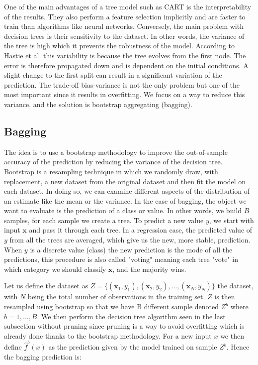 \documentclass[a4paper,12pt]{article}
\numberwithin{equation}{section}
\begin{document}
One of the main advantages of a tree model such as CART is the interpretability of the results. They also perform a feature selection implicitly and are faster to train than algorithms like neural networks. Conversely, the main problem with decision trees is their sensitivity to the dataset. In other words, the variance of the tree is high which it prevents the robustness of the model. According to Hastie et al. this variability is because the tree evolves from the first node. The error is therefore propagated down and is dependent on the initial conditions. A slight change to the first split can result in a significant variation of the prediction. The trade-off bias-variance is not the only problem but one of the most important since it results in overfitting. We focus on a way to reduce this variance, and the solution is bootstrap aggregating (bagging).

\newpage
\subsection{Bagging}

The idea is to use a bootstrap methodology to improve the out-of-sample accuracy of the prediction by reducing the variance of the decision tree. Bootstrap is a resampling technique in which we randomly draw, with replacement, a new dataset from the original dataset and then fit the model on each dataset. In doing so, we can examine different aspects of the distribution of an estimate like the mean or the variance. In the case of bagging, the object we want to evaluate is the prediction of a class or value. In other words, we build $B$ samples, for each sample we create a tree. To predict a new value $y$, we start with input $\boldsymbol{x}$ and pass it through each tree. In a regression case, the predicted value of $y$ from all the trees are averaged, which give us the new, more stable, prediction. When $y$ is a discrete value (class) the new prediction is the mode of all the predictions, this procedure is also called "voting" meaning each tree "vote" in which category we should classify $\boldsymbol{x}$, and the majority wins. 

Let us define the dataset as $Z = \{(\boldsymbol{x}_1,y_1),(\boldsymbol{x}_2,y_2),\dots,(\boldsymbol{x}_N,y_N)\}$ the dataset, with $N$ being the total number of observations in the training set. $Z$ is then resampled using bootstrap so that we have B different sample denoted $Z^b$ where $b = 1,\dots,B$. We then perform the decision tree algorithm seen in the last subsection without pruning since pruning is a way to avoid overfitting which is already done thanks to the bootstrap methodology. For a new input $x$ we then define $\hat{f}^b(x)$ as the prediction given by the model trained on sample $Z^b$. Hence the bagging prediction is:
\end{document}
